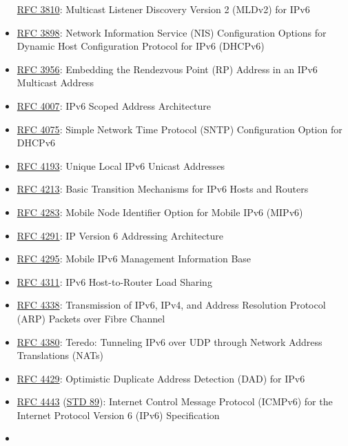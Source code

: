 \documentclass[
]{article}
\begin{document}
\begin{itemize}
  \href{https://www.rfc-editor.org/info/rfc3810}{RFC 3810}: Multicast
  Listener Discovery Version 2 (MLDv2) for IPv6
\item
  \href{https://www.rfc-editor.org/info/rfc3898}{RFC 3898}: Network
  Information Service (NIS) Configuration Options for Dynamic Host
  Configuration Protocol for IPv6 (DHCPv6)
\item
  \href{https://www.rfc-editor.org/info/rfc3956}{RFC 3956}: Embedding
  the Rendezvous Point (RP) Address in an IPv6 Multicast Address
\item
  \href{https://www.rfc-editor.org/info/rfc4007}{RFC 4007}: IPv6 Scoped
  Address Architecture
\item
  \href{https://www.rfc-editor.org/info/rfc4075}{RFC 4075}: Simple
  Network Time Protocol (SNTP) Configuration Option for DHCPv6
\item
  \href{https://www.rfc-editor.org/info/rfc4193}{RFC 4193}: Unique Local
  IPv6 Unicast Addresses
\item
  \href{https://www.rfc-editor.org/info/rfc4213}{RFC 4213}: Basic
  Transition Mechanisms for IPv6 Hosts and Routers
\item
  \href{https://www.rfc-editor.org/info/rfc4283}{RFC 4283}: Mobile Node
  Identifier Option for Mobile IPv6 (MIPv6)
\item
  \href{https://www.rfc-editor.org/info/rfc4291}{RFC 4291}: IP Version 6
  Addressing Architecture
\item
  \href{https://www.rfc-editor.org/info/rfc4295}{RFC 4295}: Mobile IPv6
  Management Information Base
\item
  \href{https://www.rfc-editor.org/info/rfc4311}{RFC 4311}: IPv6
  Host-to-Router Load Sharing
\item
  \href{https://www.rfc-editor.org/info/rfc4338}{RFC 4338}: Transmission
  of IPv6, IPv4, and Address Resolution Protocol (ARP) Packets over
  Fibre Channel
\item
  \href{https://www.rfc-editor.org/info/rfc4380}{RFC 4380}: Teredo:
  Tunneling IPv6 over UDP through Network Address Translations (NATs)
\item
  \href{https://www.rfc-editor.org/info/rfc4429}{RFC 4429}: Optimistic
  Duplicate Address Detection (DAD) for IPv6
\item
  \href{https://www.rfc-editor.org/info/rfc4443}{RFC 4443}
  (\href{https://www.rfc-editor.org/info/std89}{STD 89}): Internet
  Control Message Protocol (ICMPv6) for the Internet Protocol Version 6
  (IPv6) Specification
\item

\end{itemize}
\end{document}

